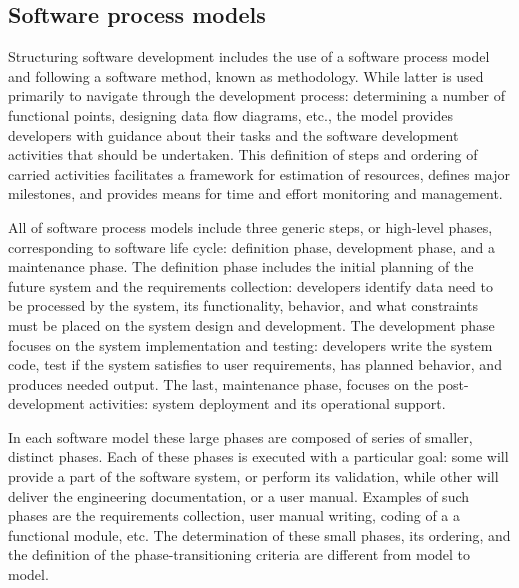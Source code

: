 \subsection{Software process models}
Structuring software development includes the use of a software process model and following 
a software method, known as methodology. While latter is used primarily to navigate 
through the development process: determining a number of functional points, 
designing data flow diagrams, etc., the model provides developers with guidance about their 
tasks and the software development activities that should be undertaken. 
This definition of steps and ordering of carried activities facilitates
a framework for estimation of resources, defines major milestones, and provides 
means for time and effort monitoring and management. 

All of software process models include three generic steps, or high-level phases, 
corresponding to software life cycle: definition phase, development phase, and a maintenance phase. 
The definition phase includes the initial planning of the future system and 
the requirements collection: developers identify data need to be processed by the system, 
its functionality, behavior, and what constraints must be placed on the system design 
and development. 
The development phase focuses on the system implementation and testing: 
developers write the system code, test if the system satisfies to user requirements, 
has planned behavior, and produces needed output. 
The last, maintenance phase, focuses on the post-development activities: 
system deployment and its operational support. 

In each software model these large phases are composed of series of smaller, distinct phases.
Each of these phases is executed with a particular 
goal: some will provide a part of the software system, or perform its validation, 
while other will deliver the engineering documentation, or a user manual. 
Examples of such phases are the requirements collection, user manual writing, 
coding of a a functional module, etc.
The determination of these small phases, its ordering, and the definition of the phase-transitioning 
criteria are different from model to model.


